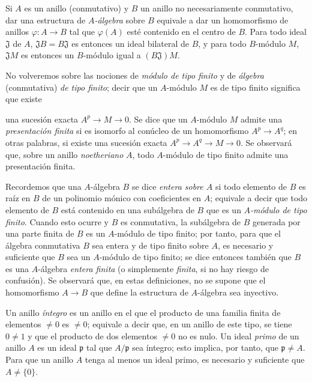 \begin{env}[1.0.4]
\label{0.1.0.4-fr}
Si $A$ es un anillo (conmutativo) y $B$ un anillo no necesariamente conmutativo, dar una estructura de \emph{$A$-álgebra} sobre $B$ equivale a dar un homomorfismo de anillos $\varphi:A\to B$ tal que $\varphi(A)$ esté contenido en el centro de $B$.
Para todo ideal $\mathfrak{J}$ de $A$, $\mathfrak{J}B=B\mathfrak{J}$ es entonces un ideal bilateral de $B$, y para todo $B$-módulo $M$, $\mathfrak{J}M$ es entonces un $B$-módulo igual a $(B\mathfrak{J})M$.
\end{env}

\begin{env}[1.0.5]
\label{0.1.0.5-fr}
No volveremos sobre las nociones de \emph{módulo de tipo finito} y de \emph{álgebra} (conmutativa) \emph{de tipo finito}; decir que un $A$-módulo $M$ es de tipo finito significa que existe

una sucesión exacta $A^p\to M\to 0$.
Se dice que un $A$-módulo $M$ admite una \emph{presentación finita} si es isomorfo al conúcleo de un homomorfismo $A^p\to A^q$; en otras palabras, si existe una sucesión exacta $A^p\to A^q\to M\to 0$.
Se observará que, sobre un anillo \emph{noetheriano} $A$, todo $A$-módulo de tipo finito admite una presentación finita.

Recordemos que una $A$-álgebra $B$ se dice \emph{entera sobre $A$} si todo elemento de $B$ es raíz en $B$ de un polinomio mónico con coeficientes en $A$; equivale a decir que todo elemento de $B$ está contenido en una subálgebra de $B$ que es un \emph{$A$-módulo de tipo finito}.
Cuando esto ocurre y $B$ es conmutativa, la subálgebra de $B$ generada por una parte finita de $B$ es un $A$-módulo de tipo finito; por tanto, para que el álgebra conmutativa $B$ sea entera y de tipo finito sobre $A$, es necesario y suficiente que $B$ sea un $A$-módulo de tipo finito; se dice entonces también que $B$ es una $A$-álgebra \emph{entera finita} (o simplemente \emph{finita}, si no hay riesgo de confusión).
Se observará que, en estas definiciones, no se supone que el homomorfismo $A\to B$ que define la estructura de $A$-álgebra sea inyectivo.
\end{env}

\begin{env}[1.0.6]
\label{0.1.0.6-fr}
Un anillo \emph{íntegro} es un anillo en el que el producto de una familia finita de elementos $\neq 0$ es $\neq 0$; equivale a decir que, en un anillo de este tipo, se tiene $0\neq 1$ y que el producto de dos elementos $\neq 0$ no es nulo.
Un ideal \emph{primo} de un anillo $A$ es un ideal $\mathfrak{p}$ tal que $A/\mathfrak{p}$ sea íntegro; esto implica, por tanto, que $\mathfrak{p}\neq A$.
Para que un anillo $A$ tenga al menos un ideal primo, es necesario y suficiente que $A\neq\{0\}$.
\end{env}

